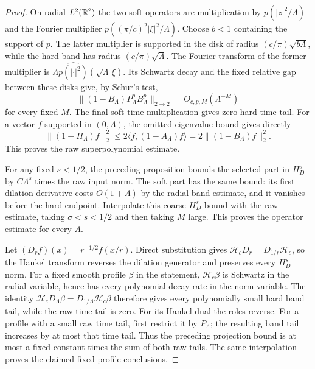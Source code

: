 \begin{proof}
On radial $L^2(\mathbb R^2)$ the two soft operators are multiplication by
$p(|z|^2/\Lambda)$ and the Fourier multiplier
$p((\pi/c)^2|\xi|^2/\Lambda)$. Choose $b<1$ containing the support
of $p$. The latter multiplier is supported in the disk of radius
$(c/\pi)\sqrt{b\Lambda}$, while the hard band has radius
$(c/\pi)\sqrt\Lambda$. The Fourier transform of the former
multiplier is
$\Lambda\widehat{p(|\cdot|^2)}(\sqrt\Lambda\,\xi)$.
Its Schwartz decay and the fixed relative gap between these disks
give, by Schur's test,
\[
 \|(1-B_\Lambda)P^p_\Lambda B^p_\Lambda\|_{2\to2}
                                  =O_{c,p,M}(\Lambda^{-M})
\]
for every fixed $M$. The final soft time multiplication gives
zero hard time tail.
For a vector $f$ supported in $(0,\Lambda)$, the omitted-eigenvalue
bound gives directly
\[
 \|(1-\Pi_\Lambda)f\|_2^2
       \leq2\langle f,(1-A_\Lambda)f\rangle
       =2\|(1-B_\Lambda)f\|_2^2.
\]
This proves the raw superpolynomial estimate.

For any fixed $s<1/2$, the preceding proposition bounds the selected
part in $H_D^s$ by $C\Lambda^s$ times the raw input norm. The soft
part has the same bound: its first dilation derivative costs
$O(1+\Lambda)$ by the radial band estimate, and it vanishes before
the hard endpoint. Interpolate this coarse $H_D^s$ bound with the
raw estimate, taking $\sigma<s<1/2$ and then taking $M$ large.
This proves the operator estimate for every $A$.

Let $(D_r f)(x)=r^{-1/2}f(x/r)$. Direct substitution gives
$\mathcal H_cD_r=D_{1/r}\mathcal H_c$, so the Hankel transform
reverses the dilation generator and preserves every $H_D^s$ norm.
For a fixed smooth profile $\beta$ in the statement,
$\mathcal H_c\beta$ is Schwartz in the radial variable, hence has
every polynomial decay rate in the norm variable. The identity
$\mathcal H_cD_\Lambda\beta=D_{1/\Lambda}\mathcal H_c\beta$
therefore gives every polynomially small hard band tail, while
the raw time tail is zero. For its Hankel dual the roles reverse.
For a profile with a small raw time tail, first restrict it by
$P_\Lambda$; the resulting band tail increases by at most that time
tail. Thus the preceding projection bound is at most a fixed
constant times the sum of both raw tails. The same interpolation
proves the claimed fixed-profile conclusions.


\end{proof}
